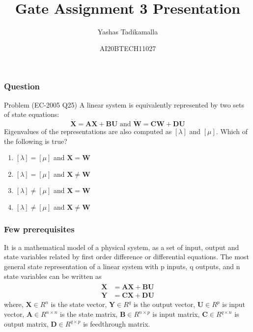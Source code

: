 \documentclass{beamer}
\title{Gate Assignment 3 Presentation}
\author{Yashas Tadikamalla}
\date{AI20BTECH11027}
\renewcommand{\vec}[1]{\mathbf{#1}}
\begin{document}
\begin{frame}
\titlepage
\end{frame}
\begin{frame}
\frametitle{Question}
\begin{block}{Problem (EC-2005 Q25)}
A linear system is equivalently represented by two sets of state equations:
$$\vec{\dot X}=\vec{A}\vec{X}+\vec{B}\vec{U} \text{ and } \vec{\dot W}=\vec{C}\vec{W}+\vec{D}\vec{U}$$
Eigenvalues of the representations are also computed as $[\lambda]$ and $[\mu]$. Which of the following is true?
\begin{enumerate}
    \item $[\lambda]=[\mu]$ and $\vec{X}=\vec{W}$
    \item $[\lambda]=[\mu]$ and $\vec{X}\neq \vec{W}$
    \item $[\lambda]\neq [\mu]$ and $\vec{X}=\vec{W}$
    \item $[\lambda]\neq[\mu]$ and $\vec{X}\neq \vec{W}$
\end{enumerate}
\end{block}
\end{frame}

\begin{frame}
\frametitle{Few prerequisites}
\begin{definition}
It is a mathematical model of a physical system, as a set of input, output and state variables related by first order difference or differential equations. The most general state representation of a linear system with p inputs, q outputs, and n state variables can be written as
\begin{align}
    \vec{\dot X}&=\vec{A}\vec{X}+\vec{B}\vec{U}\\
    \vec{Y}&=\vec{C}\vec{X}+\vec{D}\vec{U}
\end{align}
where, $\vec{X}\in R^n$ is the state vector, $\vec{Y}\in R^q$ is the output vector, $\vec{U}\in R^p$ is input vector, $\vec{A}\in R^{n\times n}$ is the state matrix, $\vec{B}\in R^{n\times p}$ is input matrix, $\vec{C}\in R^{q\times n}$ is output matrix, $\vec{D}\in R^{q\times p}$ is feedthrough matrix.
\end{definition}
\end{frame}
\end{document}
